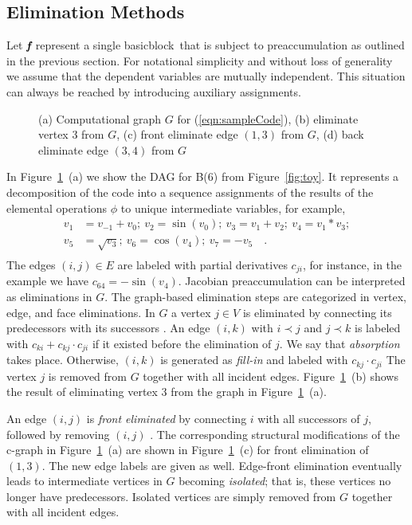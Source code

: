 \documentclass[acmtocl,acmnow]{acmtrans2m}
\newcommand{\basicblock}{basicblock}
\newcommand{\bmf}{\mbox{\bf\em f}}
\newcommand{\reffig}[1]{Figure~\ref{#1}}
\newcommand{\refeqn}[1]{(\ref{#1})}
\begin{document}
\subsection{Elimination Methods} \label{ssec:elimMeth}
Let $\bmf$ represent a single \basicblock\ that is subject to preaccumulation
as outlined in the previous section.
For notational simplicity and without loss of generality we assume that the 
dependent variables are mutually independent. 
This situation can always be
reached by introducing auxiliary assignments.
\begin{figure}[ht]
\centering{}
\caption{
(a) Computational graph $G$ for \refeqn{eqn:sampleCode}, 
(b) eliminate vertex 3 from $G$, 
(c) front eliminate edge $(1,3)$ from $G$, 
(d) back eliminate edge $(3,4)$ from $G$} 
\label{fig:elims}
\end{figure}
In \reffig{fig:elims}~(a) we show the DAG for B(6) from \reffig{fig:toy}. 
It represents a decomposition of the code into a sequence assignments of
the results of the elemental operations $\phi$ to unique intermediate 
variables,
for example,
\begin{equation}\label{eqn:sampleCode}
\begin{split}
 v_1&=v_{-1}+v_0;~v_2=\sin(v_0);~v_3=v_1+v_2;~v_4=v_1*v_3; \\
v_5&=\sqrt{v_3};~v_6=\cos(v_4);~v_7=-v_5 \quad .\\
\end{split}
\end{equation}
The edges $(i,j)\in E$ are labeled with partial derivatives
$c_{ji}$, for instance, in the 
example we have $c_{64}=-\sin(v_4)$.
Jacobian preaccumulation can be interpreted as eliminations in $G$.
The graph-based elimination steps are categorized in vertex, edge, and face 
eliminations. 
In $G$ a vertex $j \in V$ is eliminated by connecting its predecessors with
its successors \cite{GrRe91}.
An edge $(i,k)$ with
$i \prec j$ and $j \prec k$ is labeled with
$c_{ki}+c_{kj} \cdot c_{ji}$ if it existed before the elimination of $j.$
We say that {\em absorption} takes place.
Otherwise, $(i,k)$ is generated as {\em fill-in} and labeled
with $c_{kj} \cdot c_{ji}$
The vertex $j$ is removed from
$G$ together with all incident edges. 
\reffig{fig:elims}~(b) shows the result of eliminating vertex $3$
from the graph in \reffig{fig:elims}~(a).

An edge $(i,j)$ is {\em front eliminated} by connecting $i$ with all successors
of $j$, followed by removing $(i,j)$ \cite{ElimTechAD2000}.
The corresponding structural modifications of the c-graph in
\reffig{fig:elims}~(a) are shown in
\reffig{fig:elims}~(c) for front elimination of $(1,3).$
The new edge labels are given as well.
Edge-front elimination eventually leads to intermediate vertices in $G$
becoming
{\em isolated}; that is, these vertices no longer have predecessors.
Isolated vertices are simply removed from $G$ together
with all incident edges.
\end{document}
